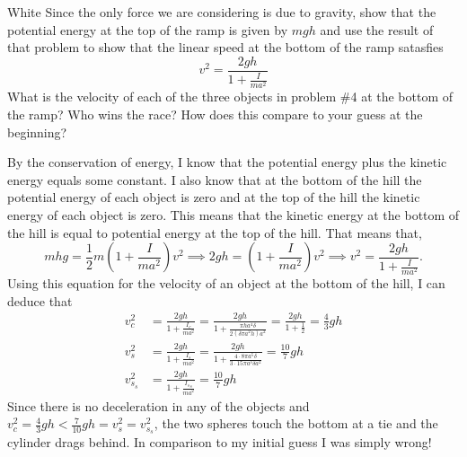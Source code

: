 \documentclass[titlepage]{article}
\begin{document}
\begin{cproblem}{5}{White}
Since the only force we are considering is due to gravity, show that the potential energy at the top of the ramp is given by $mgh$ and use the result of that problem to show that the linear speed at the bottom of the ramp satasfies
$$ v^2 = \frac{2gh}{1+\frac{I}{ma^2}}$$
What is the velocity of each of the three objects in problem \#4 at the bottom of the ramp? Who wins the race? How does this compare to your guess at the beginning?
\end{cproblem}
\begin{solution}
By the conservation of energy, I know that the potential energy plus the kinetic energy equals some constant. I also know that at the bottom of the hill the potential energy of each object is zero and at the top of the hill the kinetic energy of each object is zero. This means that the kinetic energy at the bottom of the hill is equal to potential energy at the top of the hill. That means that,
$$ mhg = \frac{1}{2}m(1 + \frac{I}{ma^2})v^2 \implies 2gh = (1+\frac{I}{ma^2})v^2 \implies v^2 = \frac{2gh}{1+\frac{I}{ma^2}}.$$
Using this equation for the velocity of an object at the bottom of the hill, I can deduce that
\begin{align*}
v^2_c &= \frac{2gh}{1+\frac{I_c}{ma^2}} = \frac{2gh}{1+\frac{\pi ha^4\delta}{2(\delta\pi a^2 h)a^2}} = \frac{2gh}{1+\frac{1}{2}} = \frac{4}{3}gh\\
v^2_s &=  \frac{2gh}{1+\frac{I_s}{ma^2}} = \frac{2gh}{1 + \frac{4\cdot8\pi a^5\delta}{3\cdot15 \pi a^3 \delta a^2}} = \frac{10}{7}gh \\
v^2_{s_s} &=  \frac{2gh}{1+\frac{I{_s}_s}{ma^2}} = \frac{10}{7} gh
\end{align*}
Since there is no deceleration in any of the objects and $ v^2_c = \frac{4}{3}gh < \frac{7}{10}gh = v^2_s = v^2_{s_s}$, the two spheres touch the bottom at a tie and the cylinder drags behind. In comparison to my initial guess I was simply wrong!
\end{solution}
\end{document}
